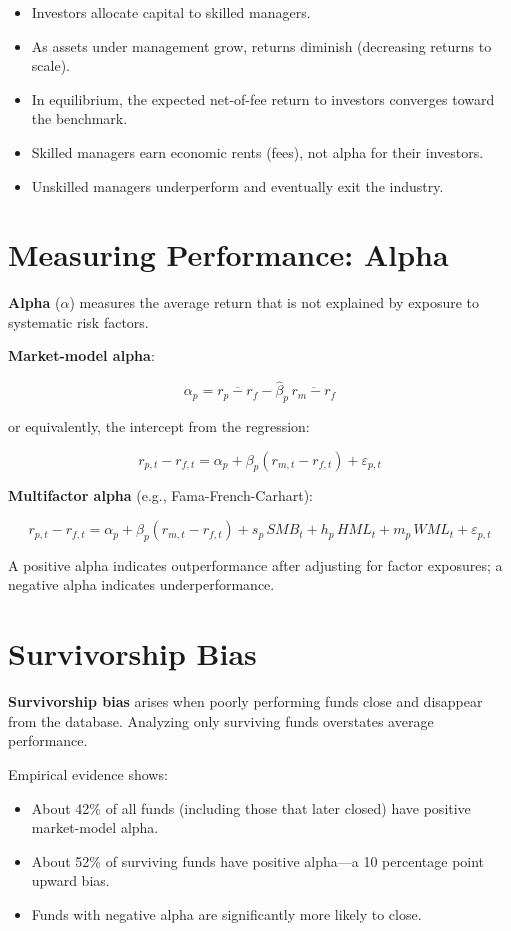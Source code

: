\documentclass[11pt,letterpaper]{report}
\begin{document}
\begin{itemize}
  \item Investors allocate capital to skilled managers.
  \item As assets under management grow, returns diminish (decreasing returns to scale).
  \item In equilibrium, the expected net-of-fee return to investors converges toward the benchmark.
  \item Skilled managers earn economic rents (fees), not alpha for their investors.
  \item Unskilled managers underperform and eventually exit the industry.
\end{itemize}

\section{Measuring Performance: Alpha}


\textbf{Alpha} ($\alpha$) measures the average return that is not explained by exposure to systematic risk factors.

\textbf{Market-model alpha}:

$$\alpha_p = \overline{r_p - r_f} - \hat{\beta}_p \, \overline{r_m - r_f}$$

or equivalently, the intercept from the regression:

$$r_{p,t} - r_{f,t} = \alpha_p + \beta_p(r_{m,t} - r_{f,t}) + \varepsilon_{p,t}$$

\textbf{Multifactor alpha} (e.g., Fama-French-Carhart):

$$r_{p,t} - r_{f,t} = \alpha_p + \beta_p(r_{m,t} - r_{f,t}) + s_p \, SMB_t + h_p \, HML_t + m_p \, WML_t + \varepsilon_{p,t}$$

A positive alpha indicates outperformance after adjusting for factor exposures; a negative alpha indicates underperformance.

\section{Survivorship Bias}


\textbf{Survivorship bias} arises when poorly performing funds close and disappear from the database.  Analyzing only surviving funds overstates average performance.

Empirical evidence shows:

\begin{itemize}
  \item About 42\% of all funds (including those that later closed) have positive market-model alpha.
  \item About 52\% of surviving funds have positive alpha---a 10 percentage point upward bias.
  \item Funds with negative alpha are significantly more likely to close.
\end{itemize}
\end{document}
